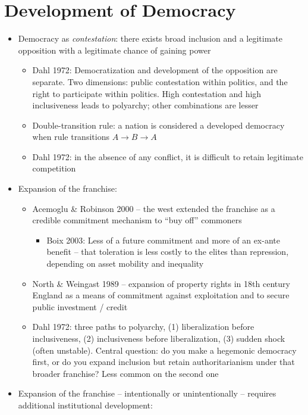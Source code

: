 \documentclass[12pt]{article}
\begin{document}
\section*{Development of Democracy}

\begin{itemize}
    \item Democracy as \emph{contestation}: there exists broad inclusion and a legitimate opposition with a legitimate chance of gaining power
    \begin{itemize}
        \item Dahl 1972: Democratization and development of the opposition are separate. Two dimensions: public contestation within politics, and the right to participate within politics. High contestation and high inclusiveness leads to polyarchy; other combinations are lesser
        \item Double-transition rule: a nation is considered a developed democracy when rule transitions $A \to B \to A$
        \item Dahl 1972: in the absence of any conflict, it is difficult to retain legitimate competition
    \end{itemize}
    \item Expansion of the franchise:
    \begin{itemize}
        \item Acemoglu \& Robinson 2000 -- the west extended the franchise as a credible commitment mechanism to ``buy off'' commoners
        \begin{itemize}
            \item Boix 2003: Less of a future commitment and more of an ex-ante benefit -- that toleration is less costly to the elites than repression, depending on asset mobility and inequality
        \end{itemize}
        \item North \& Weingast 1989 -- expansion of property rights in 18th century England as a means of commitment against exploitation and to secure public investment / credit
        \item Dahl 1972: three paths to polyarchy, (1) liberalization before inclusiveness, (2) inclusiveness before liberalization, (3) sudden shock (often unstable). Central question: do you make a hegemonic democracy first, or do you expand inclusion but retain authoritarianism under that broader franchise? Less common on the second one
    \end{itemize}
    \item Expansion of the franchise -- intentionally or unintentionally -- requires additional institutional development:

\end{itemize}
\end{document}
